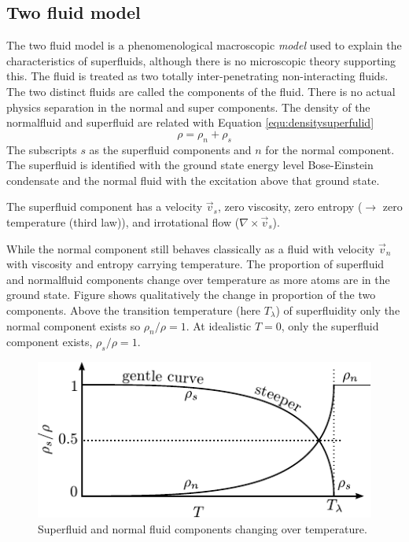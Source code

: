 \subsection{Two fluid model}
The two fluid model is a phenomenological macroscopic \emph{model} used to
explain the characteristics of superfluids, although there is no microscopic theory supporting this.%
The fluid is treated as two totally inter-penetrating non-interacting fluids.
The two distinct fluids are called the components of the fluid.
There is no actual physics separation in the normal and super components.
The density of the normalfluid and superfluid are related with Equation \ref{equ:densitysuperfulid}
\begin{equation}
\rho = \rho_n + \rho_s \label{equ:densitysuperfulid}
\end{equation}
The subscripts $s$ as the superfluid components and $n$ for the normal component.
The superfluid is identified with the ground state energy level Bose-Einstein
condensate and the normal fluid with the excitation above that ground state.

The superfluid component has a velocity $\vec{v}_s$, zero viscosity,
zero entropy ($\to$ zero temperature (third law)), and irrotational flow ($\nabla \times \vec{v}_s$).

While the normal component still behaves classically as a fluid with
velocity $\vec{v}_n$ with viscosity and entropy carrying temperature.
The proportion of superfluid and normalfluid components change over
temperature as more atoms are in the ground state.
Figure \label{fig:normalsuperfraction} shows qualitatively the
change in proportion of the two components.
Above the transition temperature (here $T_\lambda$) of superfluidity 
only the normal component exists so $\rho_n / \rho = 1$.
At idealistic $T=0$, only the superfluid component exists, $\rho_s / \rho = 1$.

\begin{figure}[htb]
\centering
\includegraphics{pics/normalsuperfraction.pdf}
\caption{Superfluid and normal fluid components changing over temperature.\label{fig:normalsuperfraction}}
\end{figure}

